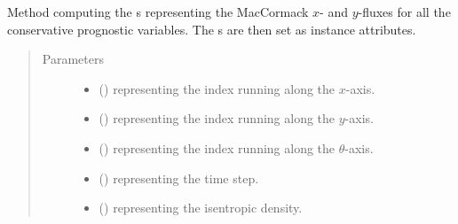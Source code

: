 \documentclass[letterpaper,10pt,english]{sphinxmanual}
\begin{document}
\begin{fulllineitems}
\begin{fulllineitems}
\begin{quote}
\begin{description}
\begin{itemize}
\end{itemize}

\end{description}\end{quote}

\end{fulllineitems}


\begin{fulllineitems}
\label{\detokenize{api:tasmania.dycore.flux_isentropic_maccormack.FluxIsentropicMacCormack._compute_horizontal_fluxes}}
Method computing the s representing the MacCormack \(x\)-
and \(y\)-fluxes for all the conservative prognostic variables.
The s are then set as instance attributes.
\begin{quote}\begin{description}
\item[{Parameters}] \leavevmode\begin{itemize}
\item {} 
 () \textendash{}  representing the index running along the \(x\)-axis.

\item {} 
 () \textendash{}  representing the index running along the \(y\)-axis.

\item {} 
 () \textendash{}  representing the index running along the \(\theta\)-axis.

\item {} 
 () \textendash{}  representing the time step.

\item {} 
 () \textendash{}  representing the isentropic density.


\end{itemize}
\end{description}
\end{quote}
\end{fulllineitems}
\end{fulllineitems}
\end{document}
